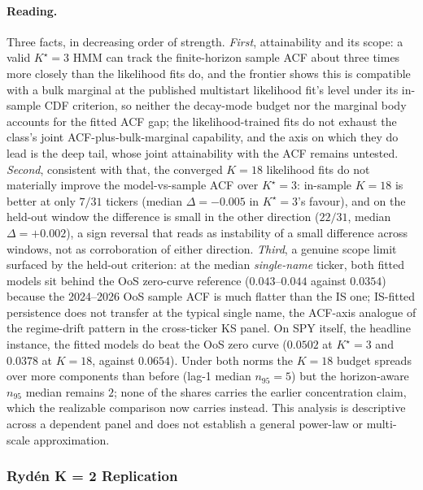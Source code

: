 \paragraph{Reading.}
Three facts, in decreasing order of strength. \emph{First}, attainability and its scope: a valid $K^\star = 3$ HMM can track the finite-horizon sample ACF about three times more closely than the likelihood fits do, and the frontier shows this is compatible with a bulk marginal at the published multistart likelihood fit's level under its in-sample CDF criterion, so neither the decay-mode budget nor the marginal body accounts for the fitted ACF gap; the likelihood-trained fits do not exhaust the class's joint ACF-plus-bulk-marginal capability, and the axis on which they do lead is the deep tail, whose joint attainability with the ACF remains untested. \emph{Second}, consistent with that, the converged $K = 18$ likelihood fits do not materially improve the model-vs-sample ACF over $K^\star = 3$: in-sample $K = 18$ is better at only $7/31$ tickers (median $\Delta = -0.005$ in $K^\star = 3$'s favour), and on the held-out window the difference is small in the other direction ($22/31$, median $\Delta = +0.002$), a sign reversal that reads as instability of a small difference across windows, not as corroboration of either direction. \emph{Third}, a genuine scope limit surfaced by the held-out criterion: at the median \emph{single-name} ticker, both fitted models sit behind the OoS zero-curve reference ($0.043$--$0.044$ against $0.0354$) because the 2024--2026 OoS sample ACF is much flatter than the IS one; IS-fitted persistence does not transfer at the typical single name, the ACF-axis analogue of the regime-drift pattern in the cross-ticker KS panel. On SPY itself, the headline instance, the fitted models do beat the OoS zero curve ($0.0502$ at $K^\star = 3$ and $0.0378$ at $K = 18$, against $0.0654$). Under both norms the $K = 18$ budget spreads over more components than before (lag-1 median $n_{95} = 5$) but the horizon-aware $n_{95}$ median remains $2$; none of the shares carries the earlier concentration claim, which the realizable comparison now carries instead. This analysis is descriptive across a dependent panel and does not establish a general power-law or multi-scale approximation.

\subsubsection{Ryd\'{e}n K = 2 Replication}
\label{sec:ryden_replication}

